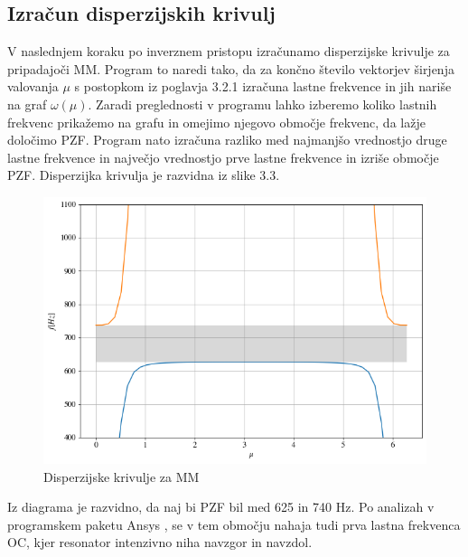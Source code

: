 \documentclass[12pt]{report}
\begin{document}
\subsection{Izračun disperzijskih krivulj}
V naslednjem koraku po inverznem pristopu izračunamo disperzijske krivulje za pripadajoči \ac{MM}. Program to naredi tako, da za končno število vektorjev širjenja valovanja $\mu$ s postopkom iz poglavja 3.2.1 izračuna
lastne frekvence in jih nariše na graf $\omega(\mu)$. Zaradi preglednosti v programu lahko izberemo koliko lastnih frekvenc prikažemo na grafu in omejimo njegovo območje frekvenc, da lažje določimo \ac{PZF}.
Program nato izračuna razliko med najmanjšo vrednostjo druge lastne frekvence in največjo vrednostjo prve lastne frekvence in izriše območje \ac{PZF}. Disperzijka krivulja je razvidna iz slike 3.3.
\begin{figure}[H]
  \centering
  \includegraphics[scale=0.6]{Images/dispersion.png}
  \caption{Disperzijske krivulje za \ac{MM}}
\end{figure}
Iz diagrama je razvidno, da naj bi \ac{PZF} bil med 625 in 740 Hz. Po analizah v programskem paketu Ansys \cite{ansys}, se v tem območju nahaja tudi prva lastna frekvenca
\ac{OC}, kjer resonator intenzivno niha navzgor in navzdol.
\end{document}
